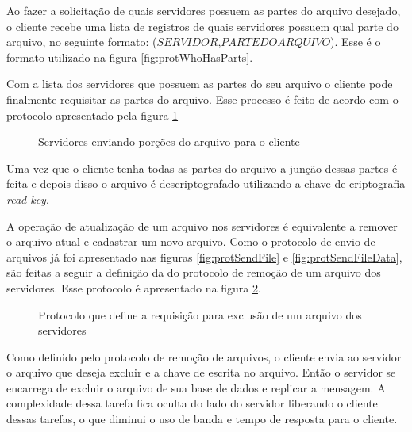         Ao fazer a solicitação de quais servidores possuem as partes do arquivo desejado, o cliente recebe uma lista de registros de quais servidores possuem qual parte do arquivo, no seguinte formato: ($SERVIDOR$,$PARTE DO ARQUIVO$). Esse é o formato utilizado na figura \ref{fig:protWhoHasParts}.
        
        Com a lista dos servidores que possuem as partes do seu arquivo o cliente pode finalmente requisitar as partes do arquivo. Esse processo é feito de acordo com o protocolo apresentado pela figura \ref{fig:protGetPart}
        
        \begin{figure}[!ht]
        \caption{Servidores enviando porções do arquivo para o cliente}
        \label{fig:protGetPart}
        \end{figure}
        
        Uma vez que o cliente tenha todas as partes do arquivo a junção dessas partes é feita e depois disso o arquivo é descriptografado utilizando a chave de criptografia \textit{read key}.
        
        A operação de atualização de um arquivo nos servidores é equivalente a remover o arquivo atual e cadastrar um novo arquivo. Como o protocolo de envio de arquivos já foi apresentado nas figuras \ref{fig:protSendFile} e \ref{fig:protSendFileData}, são feitas a seguir a definição da do protocolo de remoção de um arquivo dos servidores. Esse protocolo é apresentado na figura \ref{fig:protRemoveFile}.
        
        \begin{figure}[!ht]
        \caption{Protocolo que define a requisição para exclusão de um arquivo dos servidores}
        \label{fig:protRemoveFile}
        \end{figure}
        
        
        Como definido pelo protocolo de remoção de arquivos, o cliente envia ao servidor o arquivo que deseja excluir e a chave de escrita no arquivo. Então o servidor se encarrega de excluir o arquivo de sua base de dados e replicar a mensagem. A complexidade dessa tarefa fica oculta do lado do servidor liberando o cliente dessas tarefas, o que diminui o uso de banda e tempo de resposta para o cliente.
        
